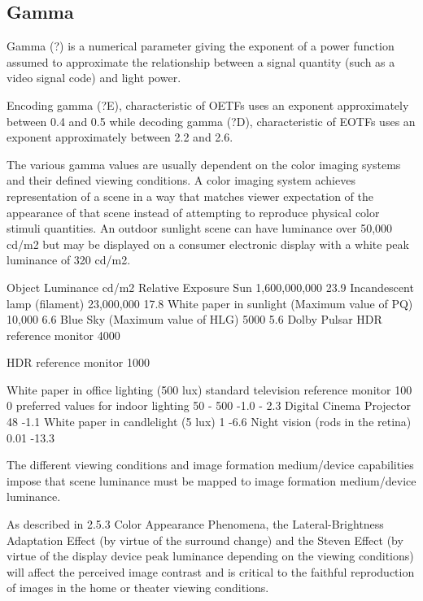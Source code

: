 \subsection{Gamma}%
\label{subsec:gamma}

Gamma (?) is a numerical parameter giving the exponent of a power function assumed to approximate the relationship between a signal quantity (such as a video signal code) and light power.

Encoding gamma (?E), characteristic of OETFs uses an exponent approximately between 0.4 and 0.5 while decoding gamma (?D), characteristic of EOTFs uses an exponent approximately between 2.2 and 2.6.

The various gamma values are usually dependent on the color imaging systems and their defined viewing conditions. A color imaging system achieves representation of a scene in a way that matches viewer expectation of the appearance of that scene instead of attempting to reproduce physical color stimuli quantities. An outdoor sunlight scene can have luminance over 50,000 cd/m2 but may be displayed on a consumer electronic display with a white peak luminance of 320 cd/m2.

Object
Luminance cd/m2
Relative Exposure
Sun
1,600,000,000
23.9
Incandescent lamp (filament)
23,000,000
17.8
White paper in sunlight
(Maximum value of PQ)
10,000
6.6
Blue Sky
(Maximum value of HLG)
5000
5.6
Dolby Pulsar HDR reference monitor
4000


HDR reference monitor
1000


White paper in office lighting (500 lux)
standard television reference monitor
100
0
preferred values for indoor lighting
50 - 500
-1.0 - 2.3
Digital Cinema Projector
48
-1.1
White paper in candlelight (5 lux)
1
-6.6
Night vision (rods in the retina)
0.01
-13.3

The different viewing conditions and image formation medium/device capabilities impose that scene luminance must be mapped to image formation medium/device luminance.

As described in 2.5.3 Color Appearance Phenomena, the Lateral-Brightness Adaptation Effect (by virtue of the surround change) and the Steven Effect (by virtue of the display device peak luminance depending on the viewing conditions) will affect the perceived image contrast and is critical to the faithful reproduction of images in the home or theater viewing conditions.

